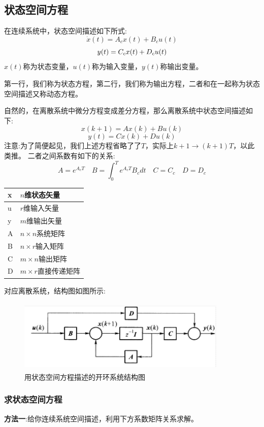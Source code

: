 \documentclass[12pt, a4paper, oneside]{ctexbook}
\begin{document}
\subsection{状态空间方程}
在连续系统中，状态空间描述如下所式:
$$
\dot{x}(t)=A_cx(t)+B_cu(t)
$$
$$
y(t)=C_cx(t)+D_cu(t)\\
$$
$x(t)$称为状态变量，$u(t)$称为输入变量，$y(t)$称输出变量。

\noindent 第一行，我们称为状态方程，第二行，我们称为输出方程，二者和在一起称为状态空间描述又称动态方程。

自然的，在离散系统中微分方程变成差分方程，那么离散系统中状态空间描述如下:
$$
x(k+1)=Ax(k)+Bu(k)
$$
$$
y(t)=Cx(k)+Du(k)
$$
注意:为了简便起见，我们上述方程省略了了$T$，实际上$k+1\to(k+1)T$，以此类推。
\noindent 二者之间系数有如下的关系:
$$
A=e^{A_cT}\quad B=\int_0^Te^{A_cT}B_cdt\quad C=C_c\quad D=D_c
$$
\begin{table}[!ht]
	\centering
	\begin{tabular}{|l|l|}
		\hline
		x & $n$维状态矢量 \\ \hline
		u & $r$维输入矢量 \\ \hline
		y & $m$维输出矢量 \\ \hline
		A & $n\times n$系统矩阵 \\ \hline
		B & $n\times r$输入矩阵 \\ \hline
		C & $m\times n$输出矩阵 \\ \hline
		D & $m\times r$直接传递矩阵 \\ \hline
	\end{tabular}
\end{table}
对应离散系统，结构图如图所示:
\begin{figure}[htbp]
	\centering
	\includegraphics[width=10cm,height=3.5cm]{img/7_2.png}
	\caption{用状态空间方程描述的开环系统结构图}
\end{figure}
\subsubsection{求状态空间方程}
\noindent \textbf{方法一}:给你连续系统空间描述，利用下方系数矩阵关系求解。
\end{document}
